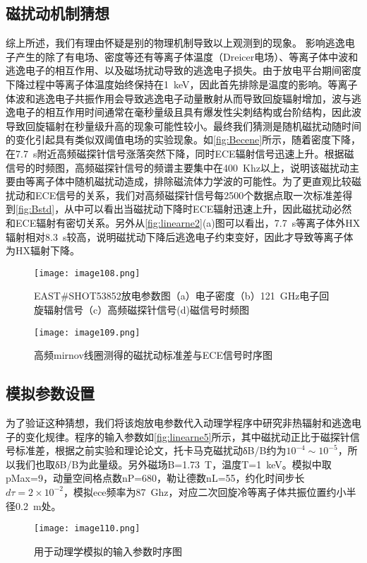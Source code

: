 \subsection{磁扰动机制猜想}
综上所述，我们有理由怀疑是别的物理机制导致以上观测到的现象。 影响逃逸电子产生的除了有电场、密度等还有等离子体温度（Dreicer电场）、等离子体中波和逃逸电子的相互作用\cite{RN1815}、以及磁场扰动导致的逃逸电子损失\cite{RN1485}。由于放电平台期间密度下降过程中等离子体温度始终保持在1~keV，因此首先排除是温度的影响。等离子体波和逃逸电子共振作用会导致逃逸电子动量散射从而导致回旋辐射增加，波与逃逸电子的相互作用时间通常在毫秒量级且具有爆发性尖刺结构或台阶结构\cite{RN2102,RN1868,RN975}，因此波导致回旋辐射在秒量级升高的现象可能性较小。最终我们猜测是随机磁扰动随时间的变化引起具有类似双阈值电场的实验现象。如\autoref{fig:Becene}所示，随着密度下降，在7.7~s附近高频磁探针信号涨落突然下降，同时ECE辐射信号迅速上升。根据磁信号的时频图，高频磁探针信号的频谱主要集中在400~Khz以上，说明该磁扰动主要由等离子体中随机磁扰动造成\cite{RN1485}，排除磁流体力学波的可能性。为了更直观比较磁扰动和ECE信号的关系，我们对高频磁探针信号每2500个数据点取一次标准差得到\autoref{fig:Bstd}，从中可以看出当磁扰动下降时ECE辐射迅速上升，因此磁扰动必然和ECE辐射有密切关系。另外从\autoref{fig:linearne2}(a)图可以看出，7.7~s等离子体外HX辐射相对8.3~s较高，说明磁扰动下降后逃逸电子约束变好，因此才导致等离子体为HX辐射下降。

\begin{figure}[ht]
\centering
\texttt{[image: image108.png]}
\caption{\label{fig:Becene}EAST\#SHOT53852放电参数图（a）电子密度（b）121~GHz电子回旋辐射信号（c）高频磁探针信号(d)磁信号时频图}
\end{figure}

\begin{figure}[ht]
\centering
\texttt{[image: image109.png]}
\caption{\label{fig:Bstd}高频mirnov线圈测得的磁扰动标准差与ECE信号时序图}
\end{figure}


\subsection{	模拟参数设置}

为了验证这种猜想，我们将该炮放电参数代入动理学程序中研究非热辐射和逃逸电子的变化规律。程序的输入参数如\autoref{fig:linearne5}所示，其中磁扰动正比于磁探针信号标准差，根据之前实验和理论论文\cite{RN2086,RN1485}，托卡马克磁扰动δB/B约为$10^{-4}\sim10^{-5}$，所以我们也取δB/B为此量级。另外磁场B=1.73~T，温度T=1~keV。模拟中取pMax=9，动量空间格点数nP=680，勒让德数nL=55，约化时间步长$dτ=2\times10^{-2}$，模拟ece频率为87~Ghz，对应二次回旋冷等离子体共振位置约小半径0.2~m处。
\begin{figure}[ht]
\centering
\texttt{[image: image110.png]}
\caption{\label{fig:linearne5}用于动理学模拟的输入参数时序图}
\end{figure}

